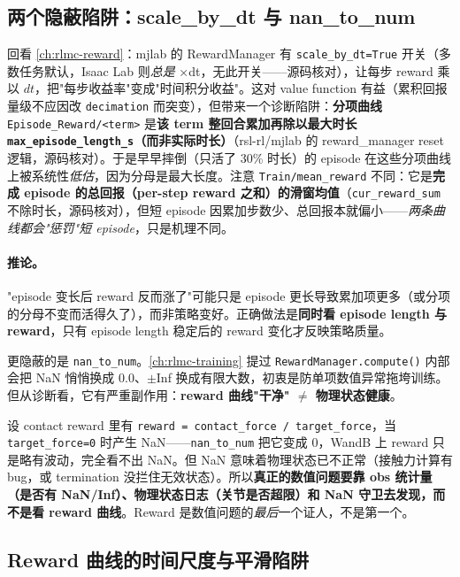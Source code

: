 \subsection{两个隐蔽陷阱：scale\_by\_dt 与 nan\_to\_num}

回看 \cref{ch:rlmc-reward}：mjlab 的 RewardManager 有 \verb|scale_by_dt=True| 开关（多数任务默认，Isaac Lab 则\emph{总是} ×dt，无此开关——源码核对），让每步 reward 乘以 $dt$，把"每步收益率"变成"时间积分收益"。这对 value function 有益（累积回报量级不应因改 \verb|decimation| 而突变），但带来一个诊断陷阱：\textbf{分项曲线} \verb|Episode_Reward/<term>| 是\textbf{该 term 整回合累加再除以最大时长 \texttt{max\_episode\_length\_s}（而非实际时长）}（rsl-rl/mjlab 的 reward\_manager reset 逻辑，源码核对）。于是早早摔倒（只活了 30\% 时长）的 episode 在这些分项曲线上被系统性\emph{低估}，因为分母是最大长度。注意 \verb|Train/mean_reward| 不同：它是\textbf{完成 episode 的总回报（per-step reward 之和）的滑窗均值}（\verb|cur_reward_sum| 不除时长，源码核对），但短 episode 因累加步数少、总回报本就偏小——\emph{两条曲线都会"惩罚"短 episode}，只是机理不同。

\paragraph{推论。}"episode 变长后 reward 反而涨了"可能只是 episode 更长导致累加项更多（或分项的分母不变而活得久了），而非策略变好。正确做法是\textbf{同时看 episode length 与 reward}，只有 episode length 稳定后的 reward 变化才反映策略质量。

更隐蔽的是 \verb|nan_to_num|。\cref{ch:rlmc-training} 提过 \verb|RewardManager.compute()| 内部会把 NaN 悄悄换成 0.0、$\pm$Inf 换成有限大数，初衷是防单项数值异常拖垮训练。但从诊断看，它有严重副作用：\textbf{reward 曲线"干净" $\neq$ 物理状态健康}。

\begin{insight}\label{ins:rlmc-diag-nantonum}
设 contact reward 里有 \verb|reward = contact_force / target_force|，当 \verb|target_force=0| 时产生 NaN——\verb|nan_to_num| 把它变成 0，WandB 上 reward 只是略有波动，完全看不出 NaN。但 NaN 意味着物理状态已不正常（接触力计算有 bug，或 termination 没拦住无效状态）。所以\textbf{真正的数值问题要靠 obs 统计量（是否有 NaN/Inf）、物理状态日志（关节是否超限）和 NaN 守卫去发现，而不是看 reward 曲线}。Reward 是数值问题的\emph{最后}一个证人，不是第一个。
\end{insight}

\subsection{Reward 曲线的时间尺度与平滑陷阱}

